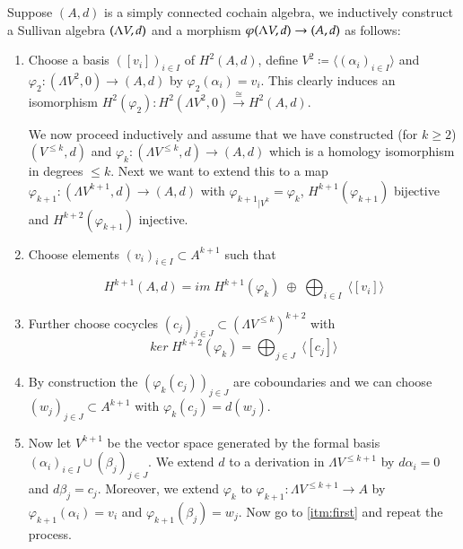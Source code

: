 \begin{Algorithm}
 Suppose $(A,d)$ is a simply connected cochain algebra, we inductively construct a Sullivan algebra $(\Lambda V,d)$ and a morphism
 $\varphi (\Lambda V,d) \to (A,d)$ as follows:
 
 \begin{enumerate}
  \item Choose a basis $([v_i])_{i \in I}$ of $H^2(A,d)$, define $V^2 \coloneqq \langle (\alpha_i)_{i \in I} \rangle$ and
  $\varphi_2 \colon (\Lambda V^2,0) \to (A,d)$ by $\varphi_2(\alpha_i) = v_i$. This clearly induces an isomorphism 
  $H^2(\varphi_2) \colon H^2(\Lambda V^2, 0) \overset{\cong}{\to} H^2(A,d)$.
   
   We now proceed inductively and assume that we have constructed (for $k \geq 2$) $(V^{\leq k}, d)$ and
   ${\varphi_k \colon (\Lambda V^{\leq k}, d) \to (A,d)}$ which is a homology isomorphism in degrees $\leq k$.
   Next we want to extend this to a map $\varphi_{k+1} \colon (\Lambda V^{k+1}, d) \to (A,d)$ with 
   ${\varphi_{k+1}}_{|V^k} = \varphi_k$, $H^{k+1}(\varphi_{k+1})$ bijective and $H^{k + 2}(\varphi_{k+1})$ injective.
   
   \item \label{itm:first} Choose elements $(v_i)_{i \in I} \subset A^{k+1}$ such that
   
   $$H^{k+1}(A,d) = im \; H^{k+1}(\varphi_k) \; \oplus \; \bigoplus_{i \in I} \; \langle [v_i] \rangle $$
   
   \item Further choose cocycles $(c_j)_{j \in J} \subset (\Lambda V^{\leq k})^{k+2}$ with
   $$ ker \; H^{k+2}(\varphi_k) = \bigoplus_{j \in J} \; \langle [c_j] \rangle$$
   
   \item By construction the $(\varphi_k(c_j))_{j \in J}$ are coboundaries and we can choose 
   $(w_j)_{j \in J} \subset A^{k+1}$ with $\varphi_k (c_j) = d(w_j)$.
   \item Now let 
   $V^{k+1}$ be the vector space generated by the formal basis $(\alpha_i)_{i \in I} \cup (\beta_j)_{j \in J}$. We extend $d$
   to a derivation in $\Lambda V^{\leq k+1}$ by $d \alpha_i = 0$ and $d \beta_j = c_j$. Moreover, we extend $\varphi_k$
   to $\varphi_{k+1} \colon \Lambda V^{ \leq k+1} \to A$ by $\varphi_{k+1} (\alpha_i) = v_i$ and 
   $\varphi_{k+1} (\beta_j) = w_j$. Now go to \ref{itm:first} and repeat the process.
 \end{enumerate}

\end{Algorithm}


